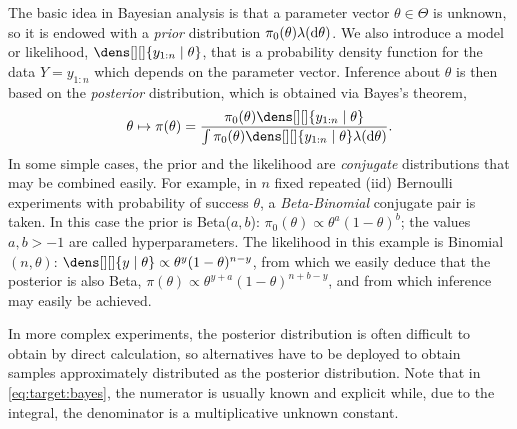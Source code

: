 \documentclass[english,graybox,envcountchap,envcountsame,sectrefs,shortlabels]{svmono}
\theoremstyle{style}
\begin{document}
The basic idea in Bayesian analysis is that a parameter vector $ \theta \in \Theta$ is unknown, so it is endowed with a \emph{prior} distribution
$\pi_0( \theta)\lambda(\mathrm{d} \theta)$.  We also
introduce a model or likelihood, $\dens[][]{ y_{1:n} \mid \theta}$, that is
a probability density function for the data $Y=y_{1:n}$ which depends on the parameter vector.
Inference about $ \theta$ is then based on the \emph{posterior}
distribution, which is obtained via Bayes's theorem,
\begin{equation} \label{eq:target:bayes}
\theta \mapsto \pi(\theta) =\frac{\pi_0( \theta) \dens[][]{ y_{1:n} \mid \theta}}{\int \pi_0( \theta) \dens[][]{ y_{1:n} \mid \theta} \lambda(\rmd \theta)}.
\end{equation}
  In some simple cases, the prior  and
the likelihood are \emph{conjugate}  distributions that may be combined easily.
For example, in $n$ fixed repeated (iid) Bernoulli experiments with probability of success $\theta$,
a \emph{Beta-Binomial} conjugate pair is taken.  In this case the prior is
Beta($a,b$):
$\pi_0(\theta) \propto \theta^{a} (1-\theta)^{b}$; the values $a,b > -1$  are called
hyperparameters. The likelihood in this example is
Binomial$(n,\theta)$:
$\dens[][]{ y \mid \theta} \propto \theta^y (1-\theta)^{n-y}$, from which
we easily deduce that the
posterior is also Beta,
$\pi ( \theta ) \propto \theta^{y+a}(1-\theta)^{n+b-y }
$, and from which inference may easily be achieved.

In more complex experiments, the posterior distribution is often difficult to obtain by direct calculation,
so alternatives have to be deployed to obtain samples approximately distributed as the posterior distribution. Note that in \eqref{eq:target:bayes}, the numerator is usually known and explicit while, due to the integral, the denominator is a multiplicative unknown constant.  
\end{document}
